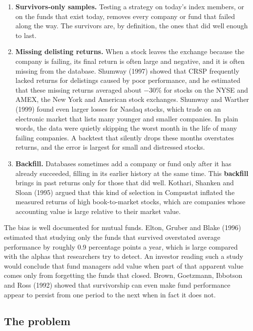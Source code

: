 \begin{enumerate}
  \item \textbf{Survivors-only samples.} Testing a strategy on today's index members, or on the funds that exist today, removes every company or fund that failed along the way. The survivors are, by definition, the ones that did well enough to last.
  \item \textbf{Missing delisting returns.} When a stock leaves the exchange because the company is failing, its final return is often large and negative, and it is often missing from the database. Shumway (1997) showed that CRSP frequently lacked returns for delistings caused by poor performance, and he estimated that these missing returns averaged about $-30$\% for stocks on the NYSE and AMEX, the New York and American stock exchanges. Shumway and Warther (1999) found even larger losses for Nasdaq stocks, which trade on an electronic market that lists many younger and smaller companies. In plain words, the data were quietly skipping the worst month in the life of many failing companies. A backtest that silently drops these months overstates returns, and the error is largest for small and distressed stocks.
  \item \textbf{Backfill.} Databases sometimes add a company or fund only after it has already succeeded, filling in its earlier history at the same time. This \textbf{backfill} brings in past returns only for those that did well. Kothari, Shanken and Sloan (1995) argued that this kind of selection in Compustat inflated the measured returns of high book-to-market stocks, which are companies whose accounting value is large relative to their market value.
\end{enumerate}

The bias is well documented for mutual funds. Elton, Gruber and Blake (1996) estimated that studying only the funds that survived overstated average performance by roughly 0.9 percentage points a year, which is large compared with the alphas that researchers try to detect. An investor reading such a study would conclude that fund managers add value when part of that apparent value comes only from forgetting the funds that closed. Brown, Goetzmann, Ibbotson and Ross (1992) showed that survivorship can even make fund performance appear to persist from one period to the next when in fact it does not.

\subsection{The problem}

